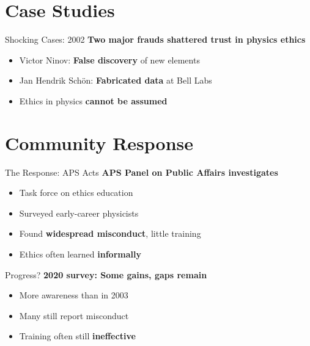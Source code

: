 \section{Case Studies}
\begin{frame}{Shocking Cases: 2002}
\textbf{Two major frauds shattered trust in physics ethics}
\begin{itemize}
  \item<1-> Victor Ninov: \textbf{False discovery} of new elements
  \item<2-> Jan Hendrik Sch\"on: \textbf{Fabricated data} at Bell Labs
  \item<3-> \alert{Ethics in physics \textbf{cannot be assumed}}
\end{itemize}
\end{frame}

\section{Community Response}
\begin{frame}{The Response: APS Acts}
\textbf{APS Panel on Public Affairs investigates}
\begin{itemize}
  \item<1-> Task force on ethics education
  \item<2-> Surveyed early-career physicists
  \item<3-> Found \textbf{widespread misconduct}, little training
  \item<4-> \alert{Ethics often learned \textbf{informally}}
\end{itemize}
\end{frame}

\begin{frame}{Progress?}
\textbf{2020 survey: Some gains, gaps remain}
\begin{itemize}
  \item<1-> More awareness than in 2003
  \item<2-> Many still report misconduct
  \item<3-> \alert{Training often still \textbf{ineffective}}
\end{itemize}
\end{frame}

